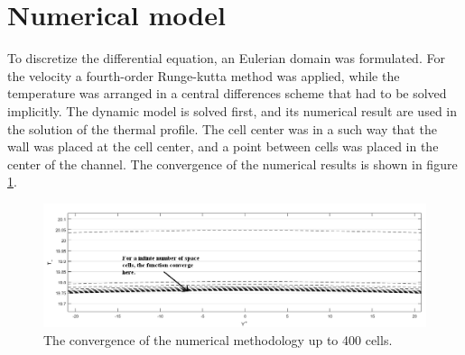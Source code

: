 \documentclass[10pt]{article} %
\begin{document}
\section{Numerical model}


To discretize the differential equation, an Eulerian domain was formulated. For the velocity a fourth-order Runge-kutta method was applied, while the temperature was arranged in a central differences scheme that had to be solved implicitly. The dynamic model is solved first, and its numerical result are used in the solution of the thermal profile. The cell center was in a such way that the wall was placed at the cell center, and a point between cells was placed in the center of the channel. The convergence of the numerical results is shown in figure \ref{sistema}.
\begin{figure}[!h]
	\centering
	\includegraphics[angle=0, trim={20mm 10mm 0mm 0mm}, clip , scale=0.5]{convergnciaprimeira}
	\caption{The convergence of the numerical methodology up to 400 cells.}
	\label{sistema}
\end{figure}
\end{document}
